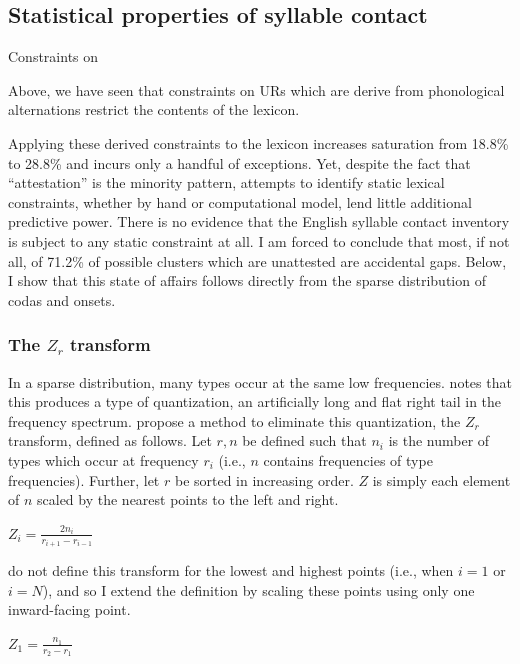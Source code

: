 \subsection{Statistical properties of syllable contact}

Constraints on 

Above, we have seen that constraints on URs which are derive from phonological alternations restrict the contents of the lexicon. 



Applying these derived constraints to the lexicon increases saturation from 18.8\% to 28.8\% and incurs only a handful of exceptions. Yet, despite the fact that ``attestation'' is the minority pattern, attempts to identify static lexical constraints, whether by hand or computational model, lend little additional predictive power. There is no evidence that the English syllable contact inventory is subject to any static constraint at all. I am forced to conclude that most, if not all, of 71.2\% of possible clusters which are unattested are accidental gaps. Below, I show that this state of affairs follows directly from the sparse distribution of codas and onsets. 

\subsubsection{The $Z_r$ transform}

In a sparse distribution, many types occur at the same low frequencies. \citet{Good1953} notes that this produces a type of quantization, an artificially long and flat right tail in the frequency spectrum. \citet[][29]{Church1991} propose a method to eliminate this quantization, the $Z_r$ transform, defined as follows.
Let $r, n$ be defined such that $n_i$ is the number of types which occur at frequency $r_i$ (i.e., $n$ contains frequencies of type frequencies). Further, let $r$ be sorted in increasing order. $Z$ is simply each element of $n$ scaled by the nearest points to the left and right. 

\begin{example}
$\displaystyle Z_i = \frac{2 n_i}{r_{i + 1} - r_{i - 1}}$
\end{example}

\noindent
\citeauthor{Church1991} do not define this transform for the lowest and highest points (i.e., when $i = 1$ or $i = N$), and so I extend the definition by scaling these points using only one inward-facing point.

\begin{example}
$\displaystyle Z_1 = \frac{n_1}{r_2 - r_1}$
\end{example}

